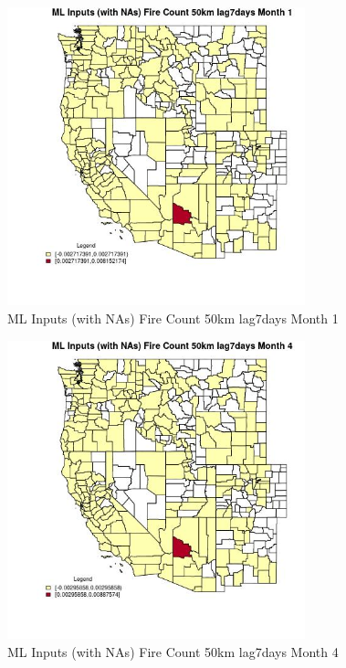 \begin{figure} 
\centering  
\includegraphics[width=0.77\textwidth]{Code_Outputs/Report_ML_input_PM25_Step4_part_e_de_duplicated_aves_compiled_2019-05-20wNAs_CountyFire_Count_50km_lag7daysmedianMonth1.jpg} 
\caption{\label{fig:Report_ML_input_PM25_Step4_part_e_de_duplicated_aves_compiled_2019-05-20wNAsCountyFire_Count_50km_lag7daysmedianMonth1}ML Inputs (with NAs) Fire Count 50km lag7days Month 1} 
\end{figure} 
 

\begin{figure} 
\centering  
\includegraphics[width=0.77\textwidth]{Code_Outputs/Report_ML_input_PM25_Step4_part_e_de_duplicated_aves_compiled_2019-05-20wNAs_CountyFire_Count_50km_lag7daysmedianMonth4.jpg} 
\caption{\label{fig:Report_ML_input_PM25_Step4_part_e_de_duplicated_aves_compiled_2019-05-20wNAsCountyFire_Count_50km_lag7daysmedianMonth4}ML Inputs (with NAs) Fire Count 50km lag7days Month 4} 
\end{figure} 
 

